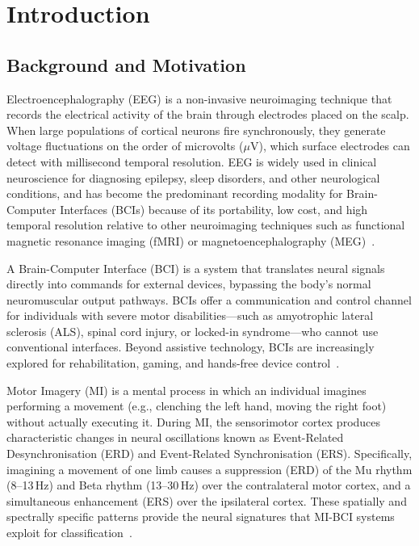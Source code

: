 \documentclass[12pt, a4paper]{article}
\begin{document}
\newpage
\begin{singlespace}
\tableofcontents
\end{singlespace}
\newpage

\section{Introduction}

\subsection{Background and Motivation}

Electroencephalography (EEG) is a non-invasive neuroimaging technique that records the electrical activity of the brain through electrodes placed on the scalp. When large populations of cortical neurons fire synchronously, they generate voltage fluctuations on the order of microvolts ($\mu$V), which surface electrodes can detect with millisecond temporal resolution. EEG is widely used in clinical neuroscience for diagnosing epilepsy, sleep disorders, and other neurological conditions, and has become the predominant recording modality for Brain-Computer Interfaces (BCIs) because of its portability, low cost, and high temporal resolution relative to other neuroimaging techniques such as functional magnetic resonance imaging (fMRI) or magnetoencephalography (MEG)~\cite{hameed2025enhancing}.

A Brain-Computer Interface (BCI) is a system that translates neural signals directly into commands for external devices, bypassing the body's normal neuromuscular output pathways. BCIs offer a communication and control channel for individuals with severe motor disabilities---such as amyotrophic lateral sclerosis (ALS), spinal cord injury, or locked-in syndrome---who cannot use conventional interfaces. Beyond assistive technology, BCIs are increasingly explored for rehabilitation, gaming, and hands-free device control~\cite{jeong2020multimodal}.

Motor Imagery (MI) is a mental process in which an individual imagines performing a movement (e.g., clenching the left hand, moving the right foot) without actually executing it. During MI, the sensorimotor cortex produces characteristic changes in neural oscillations known as Event-Related Desynchronisation (ERD) and Event-Related Synchronisation (ERS). Specifically, imagining a movement of one limb causes a suppression (ERD) of the Mu rhythm (8--13\,Hz) and Beta rhythm (13--30\,Hz) over the contralateral motor cortex, and a simultaneous enhancement (ERS) over the ipsilateral cortex. These spatially and spectrally specific patterns provide the neural signatures that MI-BCI systems exploit for classification~\cite{hameed2025enhancing}.
\end{document}
